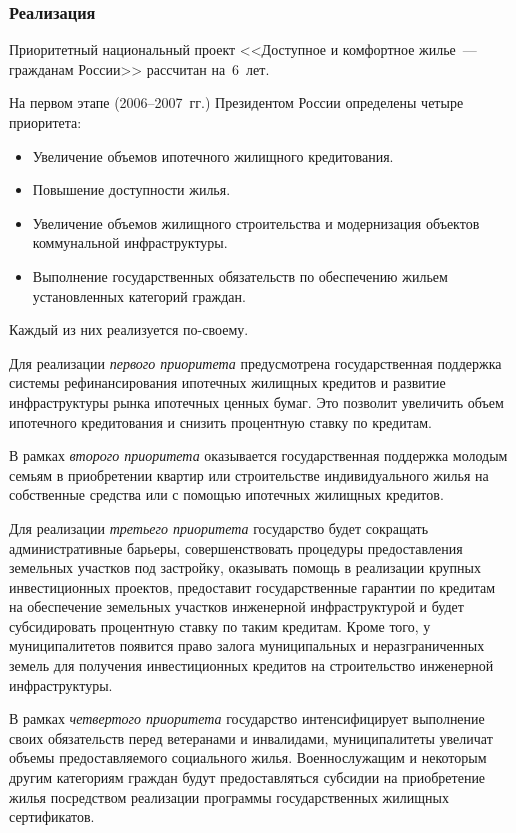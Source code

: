\documentclass[article, 12pt, russian, oneside]{ncc}
\begin{document}
\subsubsection{Реализация}

Приоритетный национальный проект <<Доступное и комфортное жилье~--- гражданам России>> рассчитан на~6~лет.

На первом этапе (2006--2007~гг.) Президентом России определены четыре приоритета:

\begin{itemize}
\item Увеличение объемов ипотечного жилищного кредитования.
\item Повышение доступности жилья.
\item Увеличение объемов жилищного строительства и модернизация
  объектов коммунальной инфраструктуры.
\item Выполнение государственных обязательств по обеспечению жильем
  установленных категорий граждан.
\end{itemize}

Каждый из них реализуется по-своему.

Для реализации \emph{первого приоритета} предусмотрена государственная
поддержка системы рефинансирования ипотечных жилищных кредитов и
развитие инфраструктуры рынка ипотечных ценных бумаг. Это позволит
увеличить объем ипотечного кредитования и снизить процентную ставку по
кредитам.

В рамках \emph{второго приоритета} оказывается государственная поддержка
молодым семьям в приобретении квартир или строительстве
индивидуального жилья на собственные средства или с помощью ипотечных
жилищных кредитов.

Для реализации \emph{третьего приоритета} государство будет сокращать
административные барьеры, совершенствовать процедуры предоставления
земельных участков под застройку, оказывать помощь в реализации
крупных инвестиционных проектов, предоставит государственные гарантии
по кредитам на обеспечение земельных участков инженерной
инфраструктурой и будет субсидировать процентную ставку по таким
кредитам. Кроме того, у муниципалитетов появится право залога
муниципальных и неразграниченных земель для получения инвестиционных
кредитов на строительство инженерной инфраструктуры.

В рамках \emph{четвертого приоритета} государство интенсифицирует выполнение
своих обязательств перед ветеранами и инвалидами, муниципалитеты
увеличат объемы предоставляемого социального жилья. Военнослужащим и
некоторым другим категориям граждан будут предоставляться субсидии на
приобретение жилья посредством реализации программы государственных
жилищных сертификатов.
\end{document}
